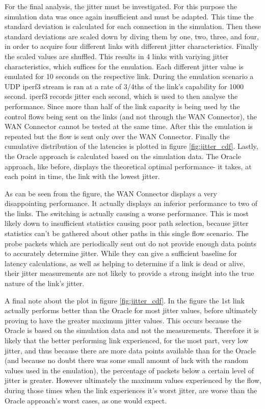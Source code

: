 For the final analysis, the jitter must be investigated. For this purpose the simulation data was once again insufficient and must be adapted. This time the standard deviation is calculated for each connection in the simulation. Then these standard deviations are scaled down by diving them by one, two, three, and four, in order to acquire four different links with different jitter characteristics. Finally the scaled values are shuffled. This results in 4 links with variying jitter characteristics, which suffices for the emulation. Each different jitter value is emulated for 10 seconds on the respective link. During the emulation scenario a UDP iperf3 stream is ran at a rate of 3/4ths of the link's capability for 1000 second. iperf3 records jitter each second, which is used to then analyse the performance. Since more than half of the link capacity is being used by the control flows being sent on the links (and not through the WAN Connector), the WAN Connector cannot be tested at the same time. After this the emulation is repeated but the flow is sent only over the WAN Connector. Finally the cumulative distribution of the latencies is plotted in figure \ref{fig:jitter_cdf}. Lastly, the Oracle approach is calculated based on the simulation data. The Oracle approach, like before, displays the theoretical optimal performance- it takes, at each point in time, the link with the lowest jitter. 

As can be seen from the figure, the WAN Connector displays a very disappointing performance. It actually displays an inferior performance to two of the links. The switching is actually causing a worse performance. This is most likely down to insufficient statistics causing poor path selection, because jitter statistics can't be gathered about other paths in this single flow scenario. The probe packets which are periodically sent out do not provide enough data points to accurately determine jitter. While they can give a sufficient baseline for latency calculations, as well as helping to determine if a link is dead or alive, their jitter measurements are not likely to provide a strong insight into the true nature of the link's jitter.

A final note about the plot in figure \ref{fig:jitter_cdf}. In the figure the 1st link actually performs better than the Oracle for most jitter values, before ultimately proving to have the greater maximum jitter values. This occurs because the Oracle is based on the simulation data and not the measurements. Therefore it is likely that the better performing link experienced, for the most part, very low jitter, and thus because there are more data points available than for the Oracle (and because no doubt there was some small amount of luck with the random values used in the emulation), the percentage of packets below a certain level of jitter is greater. However ultimately the maximum values experienced by the flow, during those times when the link experiences it's worst jitter, are worse than the Oracle approach's worst cases, as one would expect.



